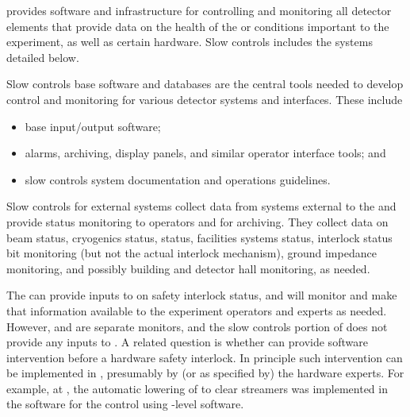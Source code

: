  provides software and infrastructure for controlling and monitoring all detector elements that provide data on the health of the  or conditions important to the experiment, as well as  certain hardware. Slow controls includes the systems detailed below.

Slow controls base software and databases are the central tools needed to develop
control and monitoring for various detector systems and interfaces. These include
\begin{itemize}
\item base input/output software;
\item alarms, archiving, display panels, and similar operator interface tools; and 
\item slow controls system documentation and operations guidelines.
\end{itemize}

Slow controls for external systems collect data from systems
external to the  and provide status monitoring to operators
and for archiving. %
They %
collect data on beam status, cryogenics status,
 status, facilities systems status, interlock
status bit monitoring (but not the actual interlock mechanism), ground
impedance monitoring, and possibly building and detector hall
monitoring, as needed. 

The  can provide inputs to  on safety interlock status, and  will monitor and make that information available to the experiment operators and experts as needed. However,  and  are separate monitors, and the slow controls portion of  does not provide any inputs to . A related question is whether  can provide software intervention before a hardware safety interlock. In principle such intervention can be implemented in , presumably by (or as specified by) the hardware experts. For example, at , the automatic lowering of  to clear streamers was implemented in the software for the  control using -level software. 

